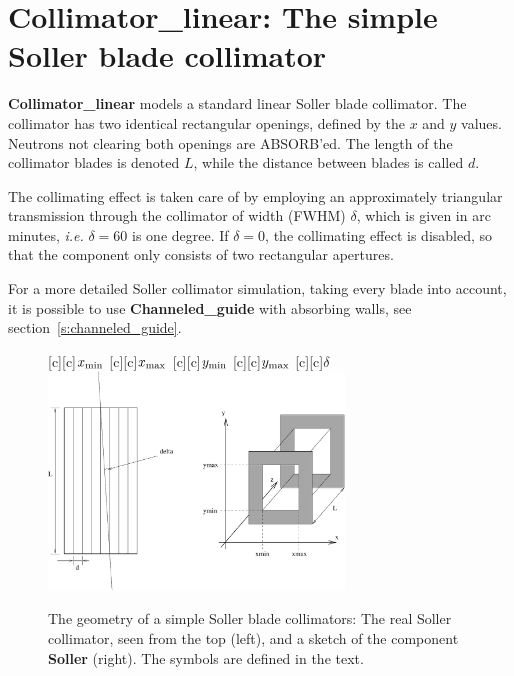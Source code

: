 \section{Collimator\_linear: The simple Soller blade collimator}
\label{collimator-linear}


{\bf Collimator\_linear} models a standard linear Soller blade collimator.
The collimator has two identical rectangular openings,
defined by the $x$ and $y$ values. Neutrons not clearing both
openings are ABSORB'ed.
The length of the collimator blades is denoted $L$, while
the distance between blades is called $d$.

The collimating effect is taken care of by employing an approximately
triangular transmission through the collimator of width (FWHM) $\delta$, 
which is given in arc minutes, {\em i.e.} $\delta=60$ is one degree.
If $\delta=0$, the collimating effect is disabled,
so that the component only consists of two rectangular apertures.

For a more detailed Soller collimator simulation,
taking every blade into account, it is possible to use
{\bf Channeled\_guide} with absorbing walls, 
see section~\ref{s:channeled_guide}.

\begin{figure}[h!]
  \begin{center}
    [c][c]{$x_{\rm min}$}
    [c][c]{$x_{\rm max}$}
    [c][c]{$y_{\rm min}$}
    [c][c]{$y_{\rm max}$}
    [c][c]{$\delta$}
    \includegraphics[width=0.7\textwidth]{figures/collimator}
  \end{center}
\caption{The geometry of a simple Soller blade collimators:
The real Soller collimator, seen from the top (left),
and a sketch of the component {\bf Soller} (right).
The symbols are defined in the text.}
\label{f:collimator}
\end{figure}

